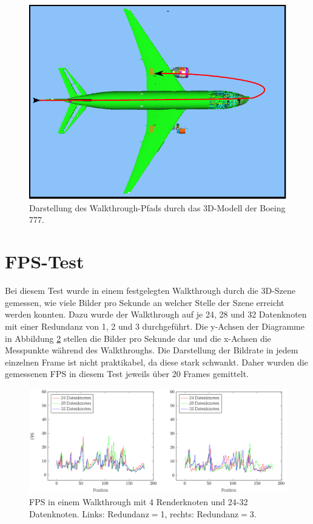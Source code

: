 \begin{figure}
\centering
\includegraphics[scale=1.0]{images/walkthrough1.pdf}
  \caption{\label{fig:eval:walkthrough1} Darstellung des Walkthrough-Pfads durch das 3D-Modell der Boeing 777.}
\end{figure}

\section{FPS-Test}
\label{sec:eval:fps}
Bei diesem Test wurde in einem festgelegten Walkthrough durch die 3D-Szene gemessen, wie viele Bilder pro Sekunde an welcher Stelle der Szene erreicht werden konnten. Dazu wurde der Walkthrough auf je 24, 28 und 32 Datenknoten mit einer Redundanz von 1, 2 und 3 durchgeführt. Die y-Achsen der Diagramme in Abbildung \ref{fig:eval:fps} stellen die Bilder pro Sekunde dar und die x-Achsen die Messpunkte während des Walkthroughs. Die Darstellung der Bildrate in jedem einzelnen Frame ist nicht praktikabel, da diese stark schwankt. Daher wurden die gemessenen FPS in diesem Test jeweils über 20 Frames gemittelt.
\begin{figure}
\centering
\includegraphics[scale=0.75]{images/diag_fps.pdf}
  \caption{\label{fig:eval:fps}FPS in einem Walkthrough mit 4 Renderknoten und 24-32 Datenknoten. Links: Redundanz$=$1, rechts: Redundanz$=$3.}
\end{figure}

